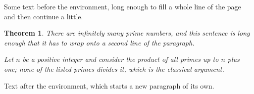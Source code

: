 \documentclass[11pt]{article}
\newtheorem{theorem}{Theorem}
\begin{document}
Some text before the environment, long enough to fill a whole line of the page and then continue a little.
\begin{theorem}
There are infinitely many prime numbers, and this sentence is long enough that it has to wrap onto a second line of the paragraph.

Let $n$ be a positive integer and consider the product of all primes up to $n$ plus one; none of the listed primes divides it, which is the classical argument.
\end{theorem}
Text after the environment, which starts a new paragraph of its own.
\end{document}
